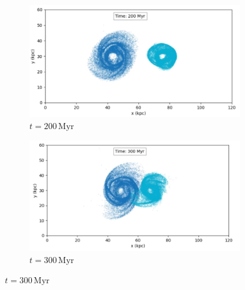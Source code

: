 \begin{figure}[htp]
    \centering
    \begin{subfigure}[b]{0.8\textwidth}
        \centering
        \includegraphics[width=\textwidth]{chapters/results/img/pm-collision/200myr.png}
        \caption{$t=200\,\text{Myr}$}
        \label{fig:collision-pm-sub1}
    \end{subfigure}

    \vspace{0.2cm}

    \begin{subfigure}[b]{0.8\textwidth}
        \centering
        \includegraphics[width=\textwidth]{chapters/results/img/pm-collision/300myr.png}
        \caption{$t=300\,\text{Myr}$}
        \label{fig:collision-pm-sub2}
    \end{subfigure}

    \vspace{0.2cm}


\end{figure}
